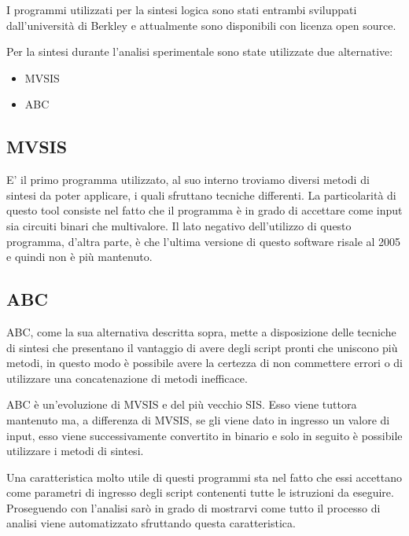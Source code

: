 \documentclass[
]{book}
\providecommand{\tightlist}{%
  \setlength{\itemsep}{0pt}\setlength{\parskip}{0pt}}
\begin{document}
I programmi utilizzati per la sintesi logica sono stati entrambi sviluppati dall'università di Berkley e attualmente sono disponibili con licenza open source.

Per la sintesi durante l'analisi sperimentale sono state utilizzate due alternative:

\begin{itemize}
\tightlist
\item
  MVSIS
\item
  ABC
\end{itemize}

\hypertarget{mvsis-1}{%
\subsection{MVSIS}\label{mvsis-1}}

E' il primo programma utilizzato, al suo interno troviamo diversi metodi di sintesi da poter applicare, i quali sfruttano tecniche differenti. La particolarità di questo tool consiste nel fatto che il programma è in grado di accettare come input sia circuiti binari che multivalore. Il lato negativo dell'utilizzo di questo programma, d'altra parte, è che l'ultima versione di questo software risale al 2005 e quindi non è più mantenuto.

\hypertarget{abc-1}{%
\subsection{ABC}\label{abc-1}}

ABC, come la sua alternativa descritta sopra, mette a disposizione delle tecniche di sintesi che presentano il vantaggio di avere degli script pronti che uniscono più metodi, in questo modo è possibile avere la certezza di non commettere errori o di utilizzare una concatenazione di metodi inefficace.

ABC è un'evoluzione di MVSIS e del più vecchio SIS. Esso viene tuttora mantenuto ma, a differenza di MVSIS, se gli viene dato in ingresso un valore di input, esso viene successivamente convertito in binario e solo in seguito è possibile utilizzare i metodi di sintesi.

Una caratteristica molto utile di questi programmi sta nel fatto che essi accettano come parametri di ingresso degli script contenenti tutte le istruzioni da eseguire. Proseguendo con l'analisi sarò in grado di mostrarvi come tutto il processo di analisi viene automatizzato sfruttando questa caratteristica.

\newpage
\end{document}
